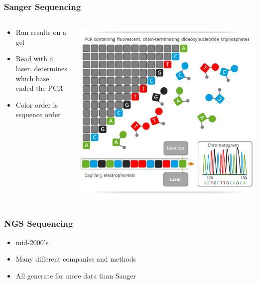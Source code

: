 \documentclass[14pt]{beamer}
\begin{document}
\begin{frame}
\frametitle{Sanger Sequencing}
\begin{columns}
	\begin{column}{0.5\textwidth}
		\begin{itemize}
			\item Run results on a gel
			\item Read with a laser, determines which base ended the PCR
			\item Color order is sequence order
		\end{itemize}
	\end{column}
	\begin{column}{0.5\textwidth}
    	\begin{center}
     		\includegraphics[width=1\textwidth]{images_20170905_sanger.jpg}
     	\end{center}
		\end{column}
	\end{columns}
\end{frame}

\begin{frame}
\frametitle{NGS Sequencing}
\begin{itemize}
	\item mid-2000's
	\item Many different companies and methods
	\item All generate far more data than Sanger
\end{itemize}
\end{frame}
\end{document}
